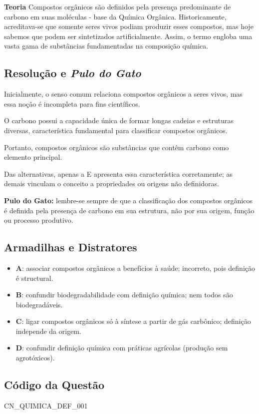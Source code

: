 \documentclass[a4paper,12pt]{article}
\begin{document}
\vspace{0.5cm}

\textbf{Teoria}\newline
Compostos orgânicos são definidos pela presença predominante de carbono em suas moléculas - base da Química Orgânica. Historicamente, acreditava-se que somente seres vivos podiam produzir esses compostos, mas hoje sabemos que podem ser sintetizados artificialmente. Assim, o termo engloba uma vasta gama de substâncias fundamentadas na composição química.


\subsection*{Resolução e \textit{Pulo do Gato}}

Inicialmente, o senso comum relaciona compostos orgânicos a seres vivos, mas essa noção é incompleta para fins científicos.

O carbono possui a capacidade única de formar longas cadeias e estruturas diversas, característica fundamental para classificar compostos orgânicos.

Portanto, compostos orgânicos são substâncias que contêm carbono como elemento principal.

Das alternativas, apenas a E apresenta essa característica corretamente; as demais vinculam o conceito a propriedades ou origens não definidoras.

\textbf{Pulo do Gato:} lembre-se sempre de que a classificação dos compostos orgânicos é definida pela presença de carbono em sua estrutura, não por sua origem, função ou processo produtivo.


\subsection*{Armadilhas e Distratores}

\begin{itemize}
  \item \textbf{A}: associar compostos orgânicos a benefícios à saúde; incorreto, pois definição é structural.
  \item \textbf{B}: confundir biodegradabilidade com definição química; nem todos são biodegradáveis.
  \item \textbf{C}: ligar compostos orgânicos só à síntese a partir de gás carbônico; definição independe da origem.
  \item \textbf{D}: confundir definição química com práticas agrícolas (produção sem agrotóxicos).
\end{itemize}


\subsection*{Código da Questão}

CN\_QUIMICA\_DEF\_001
\end{document}
